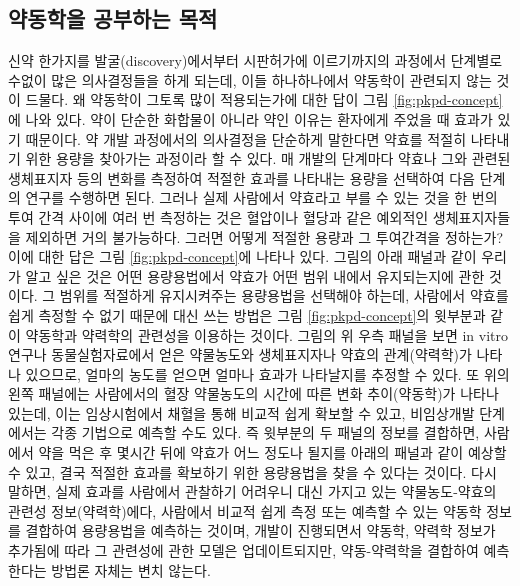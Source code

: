 \documentclass[
  11pt,
  krantz2, a4paper, twoside]{krantz}
\theoremstyle{definition}
\theoremstyle{definition}
\theoremstyle{definition}
\theoremstyle{definition}
\theoremstyle{remark}
\begin{document}

\hypertarget{uxc57duxb3d9uxd559uxc744-uxacf5uxbd80uxd558uxb294-uxbaa9uxc801}{%
\subsection{약동학을 공부하는 목적}\label{uxc57duxb3d9uxd559uxc744-uxacf5uxbd80uxd558uxb294-uxbaa9uxc801}}


신약 한가지를 발굴(discovery)에서부터 시판허가에 이르기까지의 과정에서
단계별로 수없이 많은 의사결정들을 하게 되는데, 이들 하나하나에서
약동학이 관련되지 않는 것이 드물다. 왜 약동학이 그토록 많이 적용되는가에
대한 답이 그림 \ref{fig:pkpd-concept}에 나와 있다. 약이 단순한 화합물이 아니라 약인 이유는
환자에게 주었을 때 효과가 있기 때문이다. 약 개발 과정에서의 의사결정을
단순하게 말한다면 약효를 적절히 나타내기 위한 용량을 찾아가는 과정이라
할 수 있다. 매 개발의 단계마다 약효나 그와 관련된 생체표지자 등의 변화를
측정하여 적절한 효과를 나타내는 용량을 선택하여 다음 단계의 연구를
수행하면 된다. 그러나 실제 사람에서 약효라고 부를 수 있는 것을 한 번의
투여 간격 사이에 여러 번 측정하는 것은 혈압이나 혈당과 같은 예외적인
생체표지자들을 제외하면 거의 불가능하다. 그러면 어떻게 적절한 용량과 그
투여간격을 정하는가? 이에 대한 답은 그림 \ref{fig:pkpd-concept}에 나타나 있다. 그림의 아래
패널과 같이 우리가 알고 싶은 것은 어떤 용량용법에서 약효가 어떤 범위
내에서 유지되는지에 관한 것이다. 그 범위를 적절하게 유지시켜주는
용량용법을 선택해야 하는데, 사람에서 약효를 쉽게 측정할 수 없기 때문에
대신 쓰는 방법은 그림 \ref{fig:pkpd-concept}의 윗부분과 같이 약동학과 약력학의 관련성을
이용하는 것이다. 그림의 위 우측 패널을 보면 in vitro 연구나
동물실험자료에서 얻은 약물농도와 생체표지자나 약효의 관계(약력학)가
나타나 있으므로, 얼마의 농도를 얻으면 얼마나 효과가 나타날지를 추정할 수
있다. 또 위의 왼쪽 패널에는 사람에서의 혈장 약물농도의 시간에 따른 변화
추이(약동학)가 나타나 있는데, 이는 임상시험에서 채혈을 통해 비교적 쉽게
확보할 수 있고, 비임상개발 단계에서는 각종 기법으로 예측할 수도 있다.
즉 윗부분의 두 패널의 정보를 결합하면, 사람에서 약을 먹은 후 몇시간 뒤에 약효가 어느 정도나 될지를 아래의 패널과 같이 예상할 수 있고,
결국 적절한 효과를 확보하기 위한 용량용법을 찾을 수 있다는 것이다. 다시
말하면, 실제 효과를 사람에서 관찰하기 어려우니 대신 가지고 있는
약물농도-약효의 관련성 정보(약력학)에다, 사람에서 비교적 쉽게 측정 또는
예측할 수 있는 약동학 정보를 결합하여 용량용법을 예측하는 것이며, 개발이
진행되면서 약동학, 약력학 정보가 추가됨에 따라 그 관련성에 관한 모델은 업데이트되지만,
약동-약력학을 결합하여 예측한다는 방법론 자체는 변치 않는다.
\end{document}
